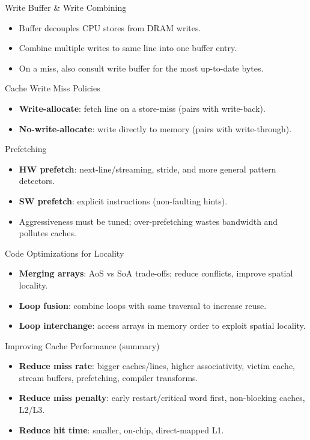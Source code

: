 \documentclass[aspectratio=169,12pt]{beamer}
\begin{document}
\begin{frame}{Write Buffer \& Write Combining}
\begin{itemize}
  \item Buffer decouples CPU stores from DRAM writes.
  \item Combine multiple writes to same line into one buffer entry.
  \item On a miss, also consult write buffer for the most up-to-date bytes.
\end{itemize}
\end{frame}

\begin{frame}{Cache Write Miss Policies}
\begin{itemize}
  \item \textbf{Write-allocate}: fetch line on a store-miss (pairs with write-back).
  \item \textbf{No-write-allocate}: write directly to memory (pairs with write-through).
\end{itemize}
\end{frame}

\begin{frame}{Prefetching}
\begin{itemize}
  \item \textbf{HW prefetch}: next-line/streaming, stride, and more general pattern detectors.
  \item \textbf{SW prefetch}: explicit instructions (non-faulting hints).
  \item Aggressiveness must be tuned; over-prefetching wastes bandwidth and pollutes caches.
\end{itemize}
\end{frame}

\begin{frame}{Code Optimizations for Locality}
\begin{itemize}
  \item \textbf{Merging arrays}: AoS vs SoA trade-offs; reduce conflicts, improve spatial locality.
  \item \textbf{Loop fusion}: combine loops with same traversal to increase reuse.
  \item \textbf{Loop interchange}: access arrays in memory order to exploit spatial locality.
\end{itemize}
\end{frame}

\begin{frame}{Improving Cache Performance (summary)}
\begin{itemize}
  \item \textbf{Reduce miss rate}: bigger caches/lines, higher associativity, victim cache, stream buffers, prefetching, compiler transforms.
  \item \textbf{Reduce miss penalty}: early restart/critical word first, non-blocking caches, L2/L3.
  \item \textbf{Reduce hit time}: smaller, on-chip, direct-mapped L1.
\end{itemize}
\end{frame}
\end{document}
